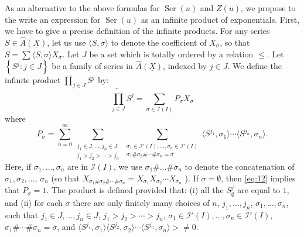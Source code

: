 \documentclass[leqno]{article}
\theoremstyle{plain}
\newcommand{\Ser}{\operatorname{Ser}}
\begin{document}
As an alternative to the above formulas for $\Ser(u)$ and $Z(u)$, we propose to the write an expression for $\Ser(u)$ as an infinite product of exponentials. First, we have to give a precise definition of the infinite products. For any series $S \in \hat{A}(\underline{X})$, let us use $\langle S, \sigma\rangle$ to denote the coefficient of $X_{\sigma}$, so that $S=\sum\langle S, \sigma\rangle X_\sigma$. Let $J$ be a set which is totally ordered by a relation $\leq$. Let $\left\{S^{j}:j \in J\right\}$ be a family of series in $\hat{A}(\underline{X})$, indexed by $j \in J$. We define the infinite product $\overleftarrow{\prod}_{j \in J} S^{j}$ by:
\begin{equation}
	\overleftarrow{\prod_{j \in J}} S^{j} = \sum_{\sigma \in \mathcal{I}(I)} P_{\sigma} X_{\sigma}
\end{equation}
where
\begin{equation} \label{eq:12}
	P_{\sigma} = 
	\sum_{n=0}^{\infty} 
	\sum_{\substack{j_{1} \in J, \ldots, j_{n} \in J \\ j_1 > j_2 > \dotsb > j_n}}
	\sum_{\substack{\sigma_{1} \in \mathcal{I}'(I), \ldots, \sigma_{n} \in \mathcal{I}'(I) \\ \sigma_1 \# \sigma_2 \# \dotsb \# \sigma_n = \sigma}} 
	\langle S^{j_1}, \sigma_{1}\rangle \cdots \langle S^{j_{n}}, \sigma_{n} \rangle.
\end{equation}
Here, if $\sigma_{1}, \ldots, \sigma_{n}$ are in $\mathcal{I}(I)$, we use $\sigma_{1} \# \ldots \# \sigma_{n}$ to denote the concatenation of $\sigma_{1}, \sigma_{2}, \ldots$, $\sigma_{n}$ (so that $X_{\sigma_{1} \# \sigma_{2} \# \cdots \# \sigma_{n}} =X_{\sigma_{1}} X_{\sigma_{2}} \cdots X_{\sigma_{n}}$ ). If $\sigma=\emptyset$, then \eqref{eq:12} implies that $P_{\sigma}=1$. The product is defined provided that: (i) all the $S^j_\emptyset$ are equal to $1$, and (ii) for each $\sigma$ there are only finitely many choices of $n$, $j_{1}, \ldots, j_{n}$, $\sigma_{1}, \ldots, \sigma_{n}$, such that $j_{1} \in J, \ldots, j_{n} \in J$, $j_{1}>j_{2}>\cdots>j_{n}$, $\sigma_{1} \in \mathcal{I}'(I), \ldots, \sigma_{n} \in \mathcal{I}'(I)$, $\sigma_{1} \# \cdots \# \sigma_{n}=\sigma$, and $\langle S^{j_{1}}, \sigma_{1}\rangle\langle S^{j_{2}}, \sigma_{2}\rangle\cdots\langle S^{j_n}, \sigma_{n}\rangle>\neq 0$.
\end{document}
